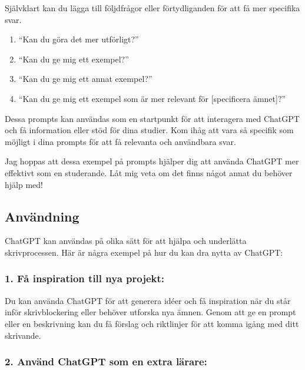 Självklart kan du lägga till följdfrågor eller förtydliganden för att få
mer specifika svar.

\begin{enumerate}
\def\labelenumi{\arabic{enumi}.}
\tightlist
\item
  ``Kan du göra det mer utförligt?''
\item
  ``Kan du ge mig ett exempel?''
\item
  ``Kan du ge mig ett annat exempel?''
\item
  ``Kan du ge mig ett exempel som är mer relevant för {[}specificera
  ämnet{]}?''
\end{enumerate}

Dessa prompts kan användas som en startpunkt för att interagera med
ChatGPT och få information eller stöd för dina studier. Kom ihåg att
vara så specifik som möjligt i dina prompts för att få relevanta och
användbara svar.

Jag hoppas att dessa exempel på prompts hjälper dig att använda ChatGPT
mer effektivt som en studerande. Låt mig veta om det finns något annat
du behöver hjälp med!

\hypertarget{anvuxe4ndning}{%
\subsection{Användning}\label{anvuxe4ndning}}

ChatGPT kan användas på olika sätt för att hjälpa och underlätta
skrivprocessen. Här är några exempel på hur du kan dra nytta av ChatGPT:

\hypertarget{fuxe5-inspiration-till-nya-projekt}{%
\subsubsection{1. Få inspiration till nya
projekt:}\label{fuxe5-inspiration-till-nya-projekt}}

Du kan använda ChatGPT för att generera idéer och få inspiration när du
står inför skrivblockering eller behöver utforska nya ämnen. Genom att
ge en prompt eller en beskrivning kan du få förslag och riktlinjer för
att komma igång med ditt skrivande.

\hypertarget{anvuxe4nd-chatgpt-som-en-extra-luxe4rare}{%
\subsubsection{2. Använd ChatGPT som en extra
lärare:}\label{anvuxe4nd-chatgpt-som-en-extra-luxe4rare}}

